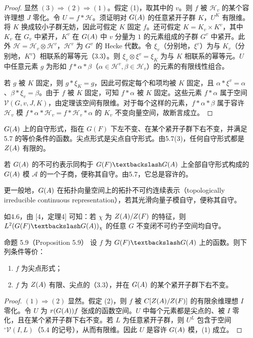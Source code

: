 \begin{proof}
显然 $(3)\Rightarrow(2)\Rightarrow(1)$。假定 (1)，取其中的 $v$。则 $f$ 被 $\mathcal H_v$ 的某个容许理想 $J$ 零化。令 $U=f*\mathcal H$。须证明对 $G(A)$ 的任意紧开子群 $K$，$U^K$ 有限维。将 $K$ 换成较小子群无妨，因此可假定 $K$ 固定 $f$。还可假定 $K=K_v\times K^v$，其中 $K_v$ 在 $G_v$ 中紧开，$K^v$ 在 $G(A)$ 中 $v$ 分量为 $1$ 的元素组成的子群 $G^v$ 中紧开。此外 $\mathcal H=\mathcal H_v\otimes\mathcal H^v$，$\mathcal H^v$ 为 $G^v$ 的 Hecke 代数。令 $\xi_v$（分别地，$\xi^v$）为与 $K_v$（分别地，$K^v$）相联系的幂等元（3.3）。则 $\xi_v\otimes\xi^v=\xi_K$ 为与 $K$ 相联系的幂等元。$U$ 中任意元素 $g$ 为形如 $f*\alpha*\beta$（$\alpha\in\mathcal H^v,\beta\in\mathcal H_v$）的元素的有限线性组合。

若 $g$ 被 $K$ 固定，则 $g*\xi_K=g$，因此可假定每个和项均被 $K$ 固定，且 $\alpha*\xi^v=\alpha$、$\beta*\xi_v=\beta$。由于 $f$ 被 $K$ 固定，可知 $f*\alpha$ 被 $K$ 固定。这些元素 $f*\alpha$ 属于空间 $\mathcal V(G,v,J,K)$，由定理该空间有限维。对于每个这样的元素，$f*\alpha*\beta$ 属于容许 $\mathcal H_v$ 模 $f*\alpha*\mathcal H_v=f*\mathcal H_v*\alpha$ 的 $K_v$ 不变向量空间，故断言成立。
\end{proof}
$G(A)$ 上的自守形式，指在 $G(F)$ 下左不变、在某个紧开子群下右不变，并满足5.7 的等价条件的函数。尖点形式是尖点自守形式。由5.7(3)，任何自守形式都是 $Z(A)$ 有限的。

若 $G(A)$ 的不可约表示同构于 $G(F)\backslash G(\A)$ 上全部自守形式构成的 $G(A)$ 模 $\mathcal A$ 的一个子商，便称其自守。由5.7，它总是容许的。

更一般地，$G(A)$ 在拓扑向量空间上的拓扑不可约连续表示（topologically irreducible continuous representation），若其光滑向量子模自守，便称其自守。

如4.6，由 [4，定理4] 可知：若 $\chi$ 为 $Z(A)/Z(F)$ 的特征，则 $L^2(G(F)\backslash G(\A))_\chi$ 的任意 $G$ 不变闭不可约子空间均自守。
\begin{originaltheorem}{命题 5.9（Proposition 5.9）}
设 $f$ 为 $G(F)\backslash G(\A)$ 上的函数。则下列条件等价：
\begin{enumerate}
\item[(1)] $f$ 为尖点形式；
\item[(2)] $f$ 为 $Z(A)$ 有限、尖点的（3.3），并在 $G(A)$ 的某个紧开子群下右不变。
\end{enumerate}
\end{originaltheorem}
\begin{proof}
$(1)\Rightarrow(2)$ 显然。假定 (2)，则 $f$ 被 $C[Z(A)/Z(F)]$ 的有限余维理想 $I$ 零化。令 $U$ 为 $r(G(A))f$ 张成的函数空间。$U$ 中每个元素都是尖点的、被 $I$ 零化，且在某个紧开子群下右不变。若 $L$ 为任意紧开子群，则 $U^L$ 包含于空间 $^\circ\mathcal V(I,L)$（5.4 的记号），从而有限维。因此 $U$ 是容许 $G(A)$ 模，(1) 成立。
\end{proof}
